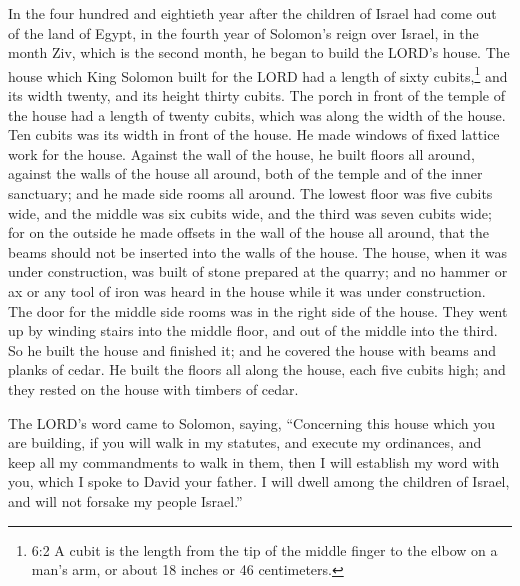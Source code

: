 \mychapter{} \myverse*{}In the four hundred and eightieth year after the children of Israel
had come out of the land of Egypt, in the fourth year of Solomon’s reign over Israel, in the month Ziv,
which is the second month, he began to build the LORD’s house.
\myverse{}The house which King Solomon built for the LORD had a length of sixty cubits,\footnote{6:2 A cubit is the length from the tip of the middle finger to the elbow on a man’s arm, or about
	18 inches or 46 centimeters.} and its width twenty, and its height thirty cubits.
\myverse{}The porch in front of the temple of the house had a length of twenty cubits,
which was along the width of the house. Ten cubits was its width in front of the house.
\myverse{}He made windows of fixed lattice work for the house.
\myverse{}Against the wall of the house, he built floors all around, against the walls
of the house all around, both of the temple and of the inner sanctuary; and he made side rooms all around.
\myverse{}The lowest floor was five cubits wide, and the middle was six cubits wide, and
the third was seven cubits wide; for on the outside he made offsets in the wall of the house all around,
that the beams should not be inserted into the walls of the house.
\myverse{}The house, when it was under construction, was built of stone prepared at the
quarry; and no hammer or ax or any tool of iron was heard in the house while it was under construction.
\myverse{}The door for the middle side rooms was in the right side of the house. They
went up by winding stairs into the middle floor, and out of the middle into the third.
\myverse{}So he built the house and finished it; and he covered the house with beams and
planks of cedar.
\myverse{}He built the floors all along the house, each five cubits high; and they rested
on the house with timbers of cedar.

\myverse{}The LORD’s word came to Solomon, saying,
\myverse{}“Concerning this house which you are building, if you will walk in my statutes,
and execute my ordinances, and keep all my commandments to walk in them, then I will establish my word
with you, which I spoke to David your father.
\myverse{}I will dwell among the children of Israel, and will not forsake my people
Israel.”

